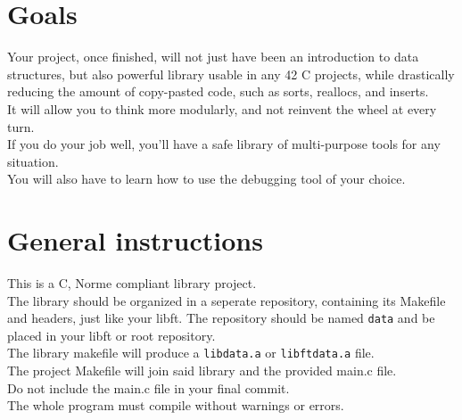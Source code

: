 \documentclass{42-en}
\begin{document}
\chapter{Goals}

    Your project, once finished, will not just have been an introduction to data structures,
    but also powerful library usable in any 42 C projects, while drastically reducing
    the amount of copy-pasted code, such as sorts, reallocs, and inserts.\\

    It will allow you to think more modularly, and not reinvent the wheel at every turn.\\

    If you do your job well, you'll have a safe library of multi-purpose tools for any situation.\\

    You will also have to learn how to use the debugging tool of your choice.

\chapter{General instructions}

    This is a C, Norme compliant library project.\\

    The library should be organized in a seperate repository, containing its
    Makefile and headers, just like your libft. The repository should be
    named \texttt{data} and be placed in your libft or root repository.\\

    The library makefile will produce a \texttt{libdata.a} or \texttt{libftdata.a} file.\\
    
    The project Makefile will join said library and the provided main.c file.\\

    Do not include the main.c file in your final commit.\\

    The whole program must compile without warnings or errors.\\
\end{document}
